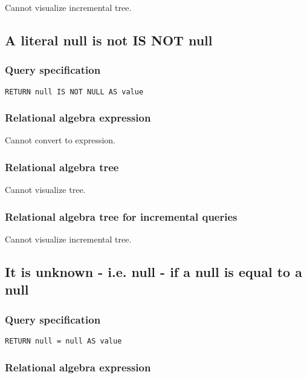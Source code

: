 Cannot visualize incremental tree.

\subsection{A literal null is not IS NOT null}

\subsubsection*{Query specification}

\begin{lstlisting}
RETURN null IS NOT NULL AS value
\end{lstlisting}

\subsubsection*{Relational algebra expression}

Cannot convert to expression.

\subsubsection*{Relational algebra tree}

Cannot visualize tree.

\subsubsection*{Relational algebra tree for incremental queries}

Cannot visualize incremental tree.

\subsection{It is unknown - i.e. null - if a null is equal to a null}

\subsubsection*{Query specification}

\begin{lstlisting}
RETURN null = null AS value
\end{lstlisting}

\subsubsection*{Relational algebra expression}

